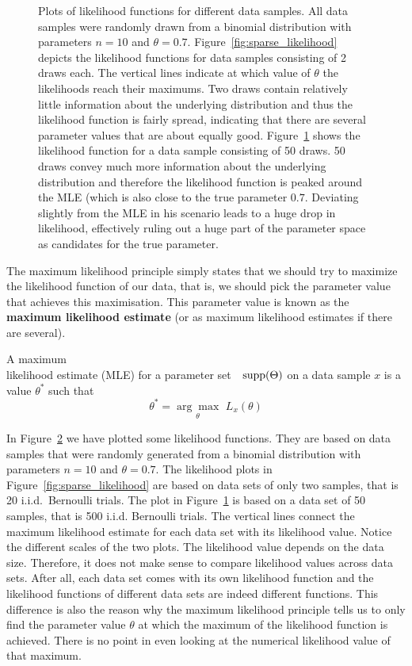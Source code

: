 \begin{figure}
\begin{subfigure}{.45\textwidth}
\caption{}
\label{fig:dense_likelihood} 
\end{subfigure}
\caption{Plots of likelihood functions for different data samples. All data samples were randomly drawn
from a binomial distribution with parameters $ n=10 $ and $ \theta=0.7 $. Figure~\ref{fig:sparse_likelihood}
depicts the likelihood functions for data samples consisting of 2 draws each. The vertical lines indicate
at which value of $ \theta $ the likelihoods reach their maximums. Two draws contain relatively little
information about the underlying distribution and thus the likelihood function is fairly spread, indicating that there
are several parameter values that are about equally good.
Figure~\ref{fig:dense_likelihood}
shows the likelihood function for a data sample consisting of 50 draws. 50 draws convey much more information about the underlying distribution
and therefore the likelihood function is peaked around the MLE (which is also close to the true parameter $ 0.7 $. Deviating slightly from the MLE in his scenario
leads to a huge drop in likelihood, effectively ruling out a huge part of the parameter space as candidates for the true parameter.}
\label{fig:likelihood_plots}
\end{figure}

The maximum likelihood principle simply states that we should try to maximize the likelihood function of
our data, that is, we should pick the parameter value that achieves this maximisation. This parameter value
is known as the \textbf{maximum likelihood estimate} (or as maximum likelihood estimates if there are several). 

\begin{Definition}
A maximum \\ likelihood estimate (MLE) for a parameter set~~$ \operatorname{supp}(\Theta) $ on a data sample $ x $ 
is a value $ \theta^{*} $ such that
$$ \theta^{*} = \underset{\theta}{\arg\max}\, \, L_{x}(\theta) $$
\end{Definition}

In Figure~\ref{fig:likelihood_plots} we have plotted some likelihood functions. They are based on data
samples that were randomly generated from a binomial distribution with parameters $ n=10 $ and 
$ \theta=0.7 $. The likelihood plots in Figure~\ref{fig:sparse_likelihood} are based on data sets of only
two samples, that is 20 i.i.d.\ Bernoulli trials. The plot in Figure~\ref{fig:dense_likelihood} is based on a 
data set of 50 samples, that is 500 i.i.d. Bernoulli trials. 
The vertical lines connect the maximum likelihood estimate
for each data set with its likelihood value. Notice the different scales of the two plots. The likelihood value depends on the
data size. Therefore, it does not make sense to compare likelihood values across data sets. After all, each data set comes with its own
likelihood function and the likelihood functions of different data sets are indeed different functions. This difference is also the
reason why the maximum likelihood principle tells us to only find the parameter value $ \theta $ at which the maximum of the
likelihood function is achieved. There is no point in even looking at the numerical likelihood value of that maximum.

